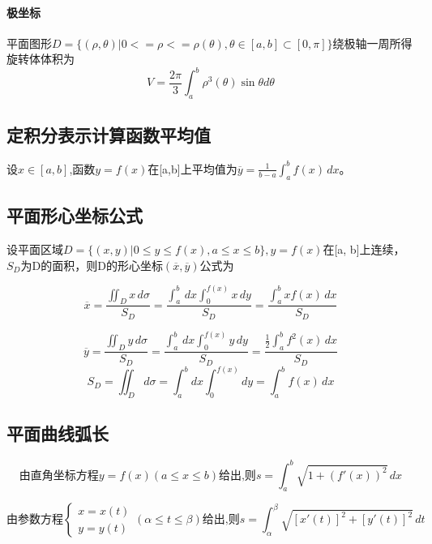 \paragraph{极坐标}
平面图形\(D = \{(\rho, \theta) | 0 <= \rho <= \rho(\theta), \theta \in [a, b] \subset [0, \pi]\}\)绕极轴一周所得旋转体体积为\[V = \dfrac{2\pi}{3}\int_a^b\rho^3(\theta)\sin\theta d\theta\]


\subsection{定积分表示计算函数平均值}

设\(x \in [a, b]\),函数\(y = f(x)\)在[a,b]上平均值为\(\overline{y} = \frac{1}{b- a} \int_{a}^{b} f(x) \,dx\)。


\subsection{平面形心坐标公式}

设平面区域\(D = \{ (x, y) | 0 \leq y \leq f(x), a \leq x \leq b \}, y = f(x)\)在[a, b]上连续，\(S_D\)为D的面积，则D的形心坐标\((\overline{x}, \overline{y})\)公式为

\begin{displaymath}
\overline{x} = \frac{\iint_{D} x \,d\sigma}{S_D} = 
\frac{\int_{a}^{b} \,dx \int_{0}^{f(x)} x \,dy}{S_D} =
\frac{\int_{a}^{b} xf(x) \,dx}{S_D}
\end{displaymath}

\begin{displaymath}
\overline{y} = \frac{\iint_{D} y \,d\sigma}{S_D} = 
\frac{\int_{a}^{b} \,dx \int_{0}^{f(x)} y \,dy}{S_D} =
\frac{\frac{1}{2}\int_{a}^{b} f^2(x) \,dx}{S_D}
\end{displaymath}
\[S_D = \iint_{D}d\sigma = \int_{a}^{b}dx \int_{0}^{f(x)}dy = \int_{a}^{b} f(x)\,dx\]


\subsection{平面曲线弧长}

\begin{displaymath}
\text{由直角坐标方程}y = f(x)(a \leq x \leq b)\text{给出,则}s = \int_{a}^{b} \sqrt{1 + (f'(x))^2} \,dx
\end{displaymath}

\begin{displaymath}
\text{由参数方程}
\begin{cases}
    x = x(t) \\
    y = y(t)
\end{cases}
(\alpha \leq t \leq \beta)\text{给出,则}s = \int_{\alpha}^{\beta} \sqrt{[x'(t)]^2 + [y'(t)]^2} \,dt
\end{displaymath}

